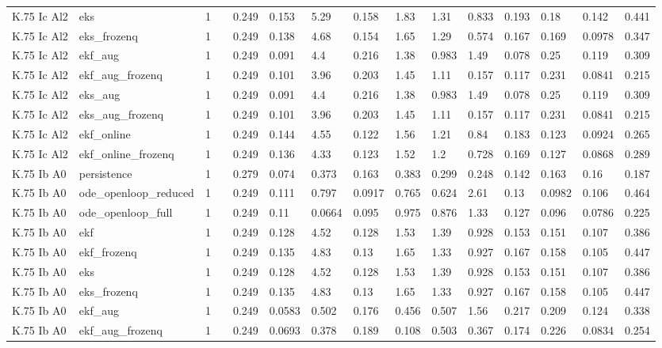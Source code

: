 \begin{table}[t]
\begin{tabular}{lllllllllllllll}
K.75 Ic Al2 & eks & 1 &  & 0.249 & 0.153 & 5.29 & 0.158 & 1.83 & 1.31 & 0.833 & 0.193 & 0.18 & 0.142 & 0.441 \\
K.75 Ic Al2 & eks\_frozenq & 1 &  & 0.249 & 0.138 & 4.68 & 0.154 & 1.65 & 1.29 & 0.574 & 0.167 & 0.169 & 0.0978 & 0.347 \\
K.75 Ic Al2 & ekf\_aug & 1 &  & 0.249 & 0.091 & 4.4 & 0.216 & 1.38 & 0.983 & 1.49 & 0.078 & 0.25 & 0.119 & 0.309 \\
K.75 Ic Al2 & ekf\_aug\_frozenq & 1 &  & 0.249 & 0.101 & 3.96 & 0.203 & 1.45 & 1.11 & 0.157 & 0.117 & 0.231 & 0.0841 & 0.215 \\
K.75 Ic Al2 & eks\_aug & 1 &  & 0.249 & 0.091 & 4.4 & 0.216 & 1.38 & 0.983 & 1.49 & 0.078 & 0.25 & 0.119 & 0.309 \\
K.75 Ic Al2 & eks\_aug\_frozenq & 1 &  & 0.249 & 0.101 & 3.96 & 0.203 & 1.45 & 1.11 & 0.157 & 0.117 & 0.231 & 0.0841 & 0.215 \\
K.75 Ic Al2 & ekf\_online & 1 &  & 0.249 & 0.144 & 4.55 & 0.122 & 1.56 & 1.21 & 0.84 & 0.183 & 0.123 & 0.0924 & 0.265 \\
K.75 Ic Al2 & ekf\_online\_frozenq & 1 &  & 0.249 & 0.136 & 4.33 & 0.123 & 1.52 & 1.2 & 0.728 & 0.169 & 0.127 & 0.0868 & 0.289 \\
K.75 Ib A0 & persistence & 1 &  & 0.279 & 0.074 & 0.373 & 0.163 & 0.383 & 0.299 & 0.248 & 0.142 & 0.163 & 0.16 & 0.187 \\
K.75 Ib A0 & ode\_openloop\_reduced & 1 &  & 0.249 & 0.111 & 0.797 & 0.0917 & 0.765 & 0.624 & 2.61 & 0.13 & 0.0982 & 0.106 & 0.464 \\
K.75 Ib A0 & ode\_openloop\_full & 1 &  & 0.249 & 0.11 & 0.0664 & 0.095 & 0.975 & 0.876 & 1.33 & 0.127 & 0.096 & 0.0786 & 0.225 \\
K.75 Ib A0 & ekf & 1 &  & 0.249 & 0.128 & 4.52 & 0.128 & 1.53 & 1.39 & 0.928 & 0.153 & 0.151 & 0.107 & 0.386 \\
K.75 Ib A0 & ekf\_frozenq & 1 &  & 0.249 & 0.135 & 4.83 & 0.13 & 1.65 & 1.33 & 0.927 & 0.167 & 0.158 & 0.105 & 0.447 \\
K.75 Ib A0 & eks & 1 &  & 0.249 & 0.128 & 4.52 & 0.128 & 1.53 & 1.39 & 0.928 & 0.153 & 0.151 & 0.107 & 0.386 \\
K.75 Ib A0 & eks\_frozenq & 1 &  & 0.249 & 0.135 & 4.83 & 0.13 & 1.65 & 1.33 & 0.927 & 0.167 & 0.158 & 0.105 & 0.447 \\
K.75 Ib A0 & ekf\_aug & 1 &  & 0.249 & 0.0583 & 0.502 & 0.176 & 0.456 & 0.507 & 1.56 & 0.217 & 0.209 & 0.124 & 0.338 \\
K.75 Ib A0 & ekf\_aug\_frozenq & 1 &  & 0.249 & 0.0693 & 0.378 & 0.189 & 0.108 & 0.503 & 0.367 & 0.174 & 0.226 & 0.0834 & 0.254 \\

\end{tabular}
\end{table}
